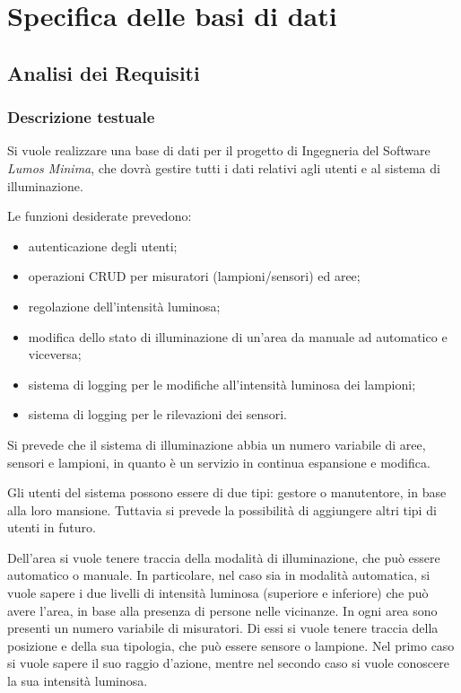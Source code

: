 \chapter{Specifica delle basi di dati}

\section{Analisi dei Requisiti}

\subsection{Descrizione testuale}
Si vuole realizzare una base di dati per il progetto di Ingegneria del Software \textit{Lumos Minima}, che dovrà gestire tutti i dati relativi agli utenti e al sistema di illuminazione.

Le funzioni desiderate prevedono:
\begin{itemize}
    \item autenticazione degli utenti;
    \item operazioni CRUD per misuratori (lampioni/sensori) ed aree;
    \item regolazione dell'intensità luminosa;
    \item modifica dello stato di illuminazione di un'area da manuale ad automatico e viceversa;
    \item sistema di logging per le modifiche all'intensità luminosa dei lampioni;
    \item sistema di logging per le rilevazioni dei sensori.
\end{itemize}

Si prevede che il sistema di illuminazione abbia un numero variabile di aree, sensori e lampioni, in quanto è un servizio in continua espansione e modifica.

Gli utenti del sistema possono essere di due tipi: gestore o manutentore, in base alla loro mansione. Tuttavia si prevede la possibilità di aggiungere altri tipi di utenti in futuro.

Dell'area si vuole tenere traccia della modalità di illuminazione, che può essere automatico o manuale. In particolare, nel caso sia in modalità automatica, si vuole sapere i due livelli di intensità luminosa (superiore e inferiore) che può avere l'area, in base alla presenza di persone nelle vicinanze.
In ogni area sono presenti un numero variabile di misuratori. Di essi si vuole tenere traccia della posizione e della sua tipologia, che può essere sensore o lampione. Nel primo caso si vuole sapere il suo raggio d'azione, mentre nel secondo caso si vuole conoscere la sua intensità luminosa.

